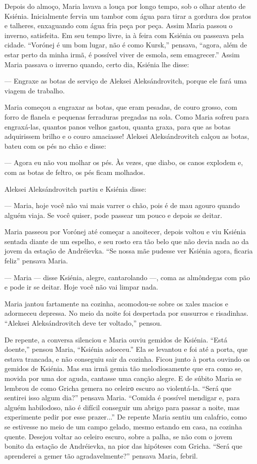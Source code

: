 Depois do almoço, Maria lavava a louça por longo tempo, sob o olhar
atento de Ksiénia. Inicialmente fervia um tambor com água para tirar a
gordura dos pratos e talheres, enxaguando com água fria peça por peça.
Assim Maria passou o inverno, satisfeita. Em seu tempo livre, ia à feira
com Ksiénia ou passeava pela cidade. ``Vorónej é um bom lugar, não é
como Kursk,'' pensava, ``agora, além de estar perto da minha irmã, é
possível viver de esmola, sem emagrecer.'' Assim Maria passava o inverno
quando, certo dia, Ksiénia lhe disse:

--- Engraxe as botas de serviço de Aleksei Aleksándrovitch, porque ele
fará uma viagem de trabalho.

Maria começou a engraxar as botas, que eram pesadas, de couro grosso,
com forro de flanela e pequenas ferraduras pregadas na sola. Como Maria
sofreu para engraxá-las, quantos panos velhos gastou, quanta graxa, para
que as botas adquirissem brilho e o couro amaciasse! Aleksei
Aleksándrovitch calçou as botas, bateu com os pés no chão e disse:

--- Agora eu não vou molhar os pés. Às vezes, que diabo, os canos
explodem e, com as botas de feltro, os pés ficam molhados.

Aleksei Aleksándrovitch partiu e Ksiénia disse:

--- Maria, hoje você não vai mais varrer o chão, pois é de mau agouro
quando alguém viaja. Se você quiser, pode passear um pouco e depois se
deitar.

Maria passeou por Vorónej até começar a anoitecer, depois voltou e viu
Ksiénia sentada diante de um espelho, e seu rosto era tão belo que não
devia nada ao da jovem da estação de Andréievka. ``Se nossa mãe pudesse
ver Ksiénia agora, ficaria feliz'' pensava Maria.

--- Maria --- disse Ksiénia, alegre, cantarolando ---, coma as
almôndegas com pão e pode ir se deitar. Hoje você não vai limpar nada.

Maria jantou fartamente na cozinha, acomodou-se sobre os xales macios e
adormeceu depressa. No meio da noite foi despertada por sussurros e
risadinhas. ``Aleksei Aleksándrovitch deve ter voltado,'' pensou.

De repente, a conversa silenciou e Maria ouviu gemidos de Ksiénia.
``Está doente,'' pensou Maria, ``Ksiénia adoeceu.'' Ela se levantou e
foi até a porta, que estava trancada, e não conseguiu sair da cozinha.
Ficou junto à porta ouvindo os gemidos de Ksiénia. Mas sua irmã gemia
tão melodiosamente que era como se, movida por uma dor aguda, cantasse
uma canção alegre. E de súbito Maria se lembrou de como Gricha gemera no
celeirо escuro ao violentá-la. ``Será que sentirei isso algum dia?''
pensava Maria. ``Comida é possível mendigar e, para alguém habilodoso,
não é difícil conseguir um abrigo para passar a noite, mas experimente
pedir por esse prazer...'' De repente Maria sentiu um calafrio, como se
estivesse no meio de um campo gelado, mesmo estando em casa, na cozinha
quente. Desejou voltar ao celeiro escuro, sobre a palha, se não com o
jovem bonito da estação de Andréievka, na pior das hipóteses com Gricha.
``Será que aprenderei a gemer tão agradavelmente?'' pensava Maria,
febril.

